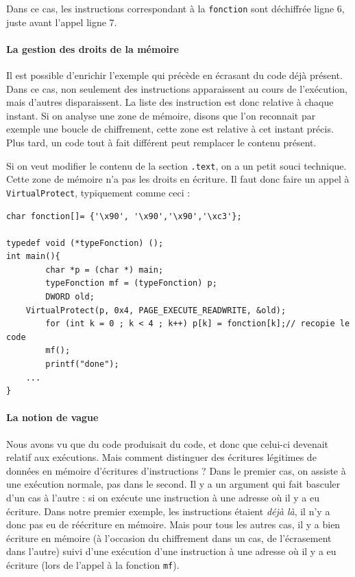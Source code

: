 \documentclass{book}
\begin{document}
Dans ce cas, les instructions correspondant à la {\tt fonction} sont déchiffrée ligne 6, juste avant l'appel  ligne 7.

\paragraph{La gestion des droits de la mémoire}

Il est possible d'enrichir l'exemple qui précède en écrasant du code déjà présent. Dans ce cas, non seulement des instructions apparaissent au cours de l'exécution, mais d'autres disparaissent. La liste des instruction est donc relative à chaque instant. Si on analyse une zone de mémoire, disons que l'on reconnait par exemple une boucle de chiffrement, cette zone est relative à cet instant précis. Plus tard, un code tout à fait différent peut remplacer le contenu présent.

Si on veut modifier le contenu de la section {\tt .text}, on a un petit souci technique. Cette zone de mémoire n'a pas les droits en écriture. Il faut donc faire un appel à {\tt VirtualProtect}, typiquement comme ceci : 

\begin{verbatim}
char fonction[]= {'\x90', '\x90','\x90','\xc3'};

typedef void (*typeFonction) (); 
int main(){
        char *p = (char *) main;
        typeFonction mf = (typeFonction) p;
        DWORD old;
	VirtualProtect(p, 0x4, PAGE_EXECUTE_READWRITE, &old);
        for (int k = 0 ; k < 4 ; k++) p[k] = fonction[k];// recopie le code
        mf();
        printf("done");
	...
}
\end{verbatim}

\paragraph{La notion de vague}

Nous avons vu que du code produisait du code, et donc que celui-ci devenait relatif aux exécutions. Mais comment distinguer des écritures légitimes de données en mémoire  d'écritures d'instructions ? Dans le premier cas, on assiste à une exécution normale, pas dans le second. Il y a un argument qui fait basculer d'un cas à l'autre : si on exécute une instruction à une adresse où il y a eu écriture. Dans notre premier exemple, les instructions étaient {\em déjà là}, il n'y a donc pas eu de réécriture en mémoire. Mais pour tous les autres cas, il y a bien écriture en mémoire (à l'occasion du chiffrement dans un cas, de l'écrasement dans l'autre) suivi d'une exécution d'une instruction à une adresse où il y a eu écriture (lors de l'appel à la fonction {\tt mf}).
\end{document}
